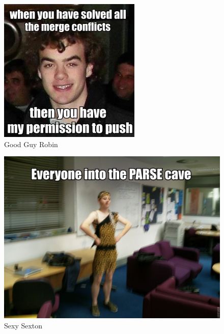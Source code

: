 \documentclass[11pt]{report}
\begin{document}
\begin{figure}[h]
\begin{center}
\includegraphics[scale=0.4]{./design/banerobin2} 
\end{center}
\caption{Good Guy Robin}
\label{fig:good guy robin}
\end{figure} 

\begin{figure}[h]
\begin{center}
\includegraphics[scale=0.4]{./design/PARSECave} 
\end{center}
\caption{Sexy Sexton}
\label{fig:sexy sexton}
\end{figure} 

\newpage

\newpage

\newpage



\end{document}
